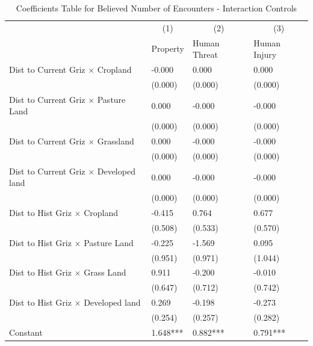 \documentclass[english,12pt]{article}
\begin{document}
\begin{table}[H]
    \centering
    \caption{Coefficients Table for Believed Number of Encounters - Interaction Controls}
    \footnotesize
    \begin{tabular}{@{}llll@{}}
        \toprule
                           &\multicolumn{1}{c}{(1)}   &\multicolumn{1}{c}{(2)}   &\multicolumn{1}{c}{(3)}  \\
                           & Property & Human Threat & Human Injury \\ \midrule
        Dist to Current Griz $\times$ Cropland&      -0.000   &       0.000   &       0.000   \\
                    &     (0.000)   &     (0.000)   &     (0.000)   \\
        Dist to Current Griz $\times$ Pasture Land&       0.000   &      -0.000   &      -0.000   \\
                    &     (0.000)   &     (0.000)   &     (0.000)   \\
        Dist to Current Griz $\times$ Grassland&       0.000   &      -0.000   &      -0.000   \\
                    &     (0.000)   &     (0.000)   &     (0.000)   \\
        Dist to Current Griz $\times$ Developed land&       0.000   &      -0.000   &      -0.000   \\
                    &     (0.000)   &     (0.000)   &     (0.000)   \\
        Dist to Hist Griz $\times$ Cropland&      -0.415   &       0.764   &       0.677   \\
                    &     (0.508)   &     (0.533)   &     (0.570)   \\
        Dist to Hist Griz $\times$ Pasture Land&      -0.225   &      -1.569   &       0.095   \\
                    &     (0.951)   &     (0.971)   &     (1.044)   \\
        Dist to Hist Griz $\times$ Grass Land&       0.911   &      -0.200   &      -0.010   \\
                    &     (0.647)   &     (0.712)   &     (0.742)   \\
        Dist to Hist Griz $\times$ Developed land&       0.269   &      -0.198   &      -0.273   \\
                    &     (0.254)   &     (0.257)   &     (0.282)   \\\midrule                       
        Constant    &       1.648***&       0.882***&       0.791***\\

\end{tabular}
\end{table}
\end{document}
